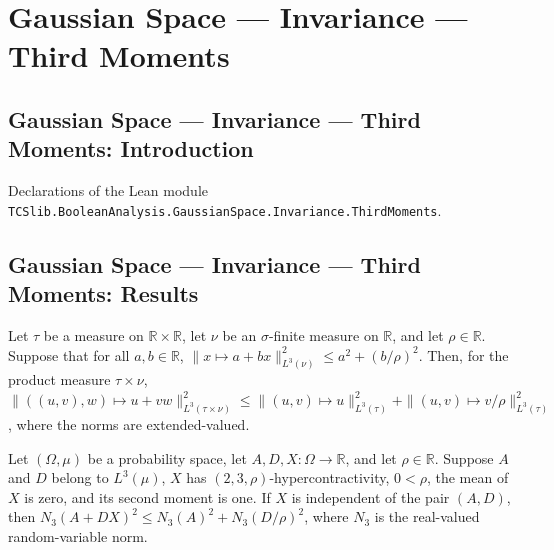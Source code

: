 \section{Gaussian Space --- Invariance --- Third Moments}
\subsection*{Gaussian Space --- Invariance --- Third Moments: Introduction}

Declarations of the Lean module \texttt{TCSlib.BooleanAnalysis.GaussianSpace.Invariance.ThirdMoments}.

\subsection*{Gaussian Space --- Invariance --- Third Moments: Results}

\begin{theorem}
\label{BooleanAnalysis.GaussianSpace.Invariance.affine_product_three_norm_sq}
\leanok
{}
Let $\tau$ be a measure on $\mathbb R\times\mathbb R$, let $\nu$ be an $\sigma$-finite
measure on $\mathbb R$, and let $\rho\in\mathbb R$. Suppose that for all $a,b\in\mathbb
R$, $\|x\mapsto a+bx\|_{L^3(\nu)}^2\le a^2+(b/\rho)^2$. Then, for the product measure
$\tau\times\nu$, $\|((u,v),w)\mapsto u+vw\|_{L^3(\tau\times\nu)}^2\le \|(u,v)\mapsto
u\|_{L^3(\tau)}^2+\|(u,v)\mapsto v/\rho\|_{L^3(\tau)}^2$, where the norms are
extended-valued.
\end{theorem}

\begin{theorem}
\label{BooleanAnalysis.GaussianSpace.Invariance.independent_affine_three_norm_sq}
\leanok
{}
Let $(\Omega,\mu)$ be a probability space, let $A,D,X:\Omega\to\mathbb R$, and let
$\rho\in\mathbb R$. Suppose $A$ and $D$ belong to $L^3(\mu)$, $X$ has
$(2,3,\rho)$-hypercontractivity, $0<\rho$, the mean of $X$ is zero, and its second
moment is one. If $X$ is independent of the pair $(A,D)$, then $N_3(A+DX)^2\le
N_3(A)^2+N_3(D/\rho)^2$, where $N_3$ is the real-valued random-variable norm.
\end{theorem}

